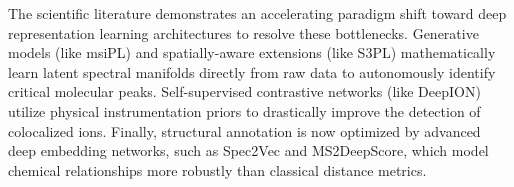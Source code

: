 \documentclass[
12pt, %
oneside, %
english, %
onehalfspacing, %
nolistspacing, %
headsepline, %
]{MastersDoctoralThesis} %
\begin{document}
The scientific literature demonstrates an accelerating paradigm shift toward deep representation learning architectures to resolve these bottlenecks. Generative models (like msiPL) and spatially-aware extensions (like S3PL) mathematically learn latent spectral manifolds directly from raw data to autonomously identify critical molecular peaks. Self-supervised contrastive networks (like DeepION) utilize physical instrumentation priors to drastically improve the detection of colocalized ions. Finally, structural annotation is now optimized by advanced deep embedding networks, such as Spec2Vec and MS2DeepScore, which model chemical relationships more robustly than classical distance metrics.

\nocite{*}

\end{document}
